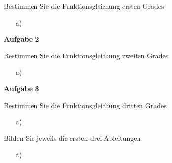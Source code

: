 



	Bestimmen Sie die Funktionsgleichung ersten Grades
	\begin{itemize}
		\item[a)]
	\end{itemize}
	\textbf{Aufgabe 2}

	Bestimmen Sie die Funktionsgleichung zweiten Grades
	\begin{itemize}
		\item[a)]
	\end{itemize}
	\textbf{Aufgabe 3}
	
	Bestimmen Sie die Funktionsgleichung dritten Grades
	\begin{itemize}
		\item[a)]
	\end{itemize}

	Bilden Sie jeweils die ersten drei Ableitungen
	\begin{itemize}
		\item[a)]
	\end{itemize}
	
